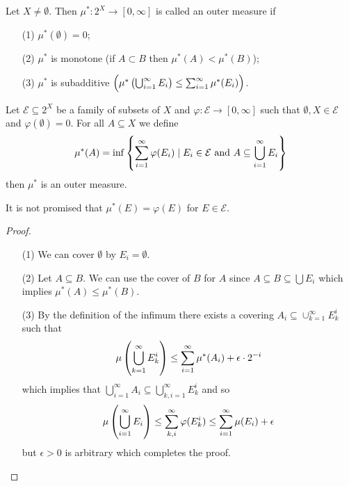 \documentclass[11pt,a4paper]{article}
\begin{document}
\begin{definition}
  Let $X \neq \emptyset$. Then $\mu^* \colon 2^X \to [0,\infty]$ is
  called an outer measure if
  \begin{enumerate}
    \item[(1)] $\mu^*(\emptyset) = 0$;
    \item[(2)] $\mu^*$ is monotone (if $A \subset B$ then $\mu^*(A) < \mu^*(B)$);
    \item[(3)] $\mu^*$ is subadditive
      $\del{\mu^*\del{\bigcup_{i=1}^{\infty} E_i} \le 
      \sum_{i=1}^{\infty} \mu^*(E_i)}$.
  \end{enumerate}
\end{definition}

\begin{proposition}
  Let $\mathcal E \subseteq 2^X$ be a family of subsets of $X$ and
  $\varphi \colon \mathcal E \to [0,\infty]$ such that
  $\emptyset, X \in \mathcal E$ and $\varphi(\emptyset) = 0$.
  For all $A \subseteq X$ we define
  \[
    \mu^*(A) = \inf\set{\sum_{i=1}^{\infty} \varphi(E_i) \mid 
    E_i \in \mathcal E \text{ and }A \subseteq \bigcup_{i=1}^{\infty} E_i}
  \]
  then $\mu^*$ is an outer measure.
\end{proposition}
\begin{remark}
  It is not promised that $\mu^*(E) = \varphi(E)$ for $E \in \mathcal E$.
\end{remark}
\begin{proof} \phantom{}
\begin{enumerate}
  \item[(1)] We can cover $\emptyset$ by $E_i = \emptyset$.
  \item[(2)] Let $A \subseteq B$.
    We can use the cover of $B$ for $A$ since 
    $A \subseteq B \subseteq \bigcup E_i$ which implies $\mu^*(A) \le \mu^*(B)$.
  \item[(3)] By the definition of the infimum there exists a covering
    $A_i \subseteq \cup_{k=1}^{\infty} E_k^i$ such that
    \[
      \mu\del{\bigcup_{k=1}^{\infty} E_k^i} \le 
      \sum_{i=1}^{\infty} \mu^*(A_i) + \epsilon \cdot 2^{-i}
    \]
    which implies that 
    $\bigcup_{i=1}^{\infty} A_i \subseteq \bigcup_{k,i=1}^{\infty} E_k^i$
    and so
    \[
      \mu\del{\bigcup_{i=1}^{\infty} E_i} \le 
      \sum_{k,i}^{\infty} \varphi(E_k^i) \le
      \sum_{i=1}^{\infty} \mu(E_i) + \epsilon
    \]
    but $\epsilon > 0$ is arbitrary which completes the proof.
\end{enumerate}
\end{proof}
\end{document}
